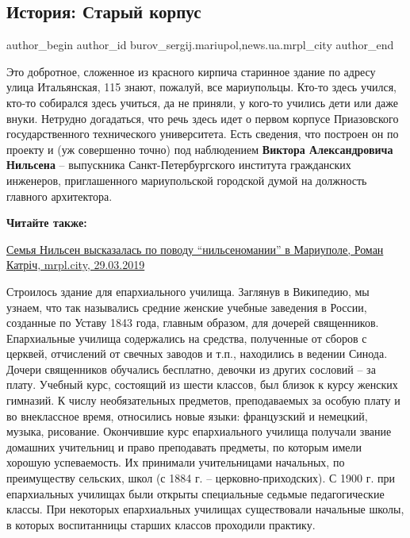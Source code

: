 
 
 
 
 
 
\subsection{История: Старый корпус}
\label{sec:30_03_2019.stz.news.ua.mrpl_city.1.istoria_staryj_korpus}
 
\ifcmt
 author_begin
   author_id burov_sergij.mariupol,news.ua.mrpl_city
 author_end
\fi


Это добротное, сложенное из красного кирпича старинное здание по адресу улица
Итальянская, 115 знают, пожалуй, все мариупольцы. Кто-то здесь учился, кто-то
собирался здесь учиться, да не приняли, у кого-то учились дети или даже внуки.
Нетрудно догадаться, что речь здесь идет о первом корпусе Приазовского
государственного технического университета. Есть сведения, что построен он по
проекту и (уж совершенно точно) под наблюдением \textbf{Виктора Александровича Нильсена}
– выпускника Санкт-Петербургского института гражданских инженеров,
приглашенного мариупольской городской думой на должность главного архитектора.

\textbf{Читайте также:} 

\href{https://mrpl.city/news/view/semya-nilsen-vyskazalas-po-povodu-nilsenomanii-v-mariupole}{%
Семья Нильсен высказалась по поводу \enquote{нильсеномании} в Мариуполе, Роман Катріч, mrpl.city, 29.03.2019}

Строилось здание для епархиального училища. Заглянув в Википедию, мы узнаем,
что так назывались средние женские учебные заведения в России, созданные по
Уставу 1843 года, главным образом, для дочерей священников. Епархиальные
училища содержались на средства, полученные от сборов с церквей, отчислений от
свечных заводов и т.п., находились в ведении Синода. Дочери священников
обучались бесплатно, девочки из других сословий – за плату. Учебный курс,
состоящий из шести классов, был близок к курсу женских гимназий. К числу
необязательных предметов, преподаваемых за особую плату и во внеклассное время,
относились новые языки: французский и немецкий, музыка, рисование. Окончившие
курс епархиального училища получали звание домашних учительниц и право
преподавать предметы, по которым имели хорошую успеваемость. Их принимали
учительницами начальных, по преимуществу сельских, школ (с 1884 г. –
церковно-приходских). С 1900 г. при епархиальных училищах были открыты
специальные седьмые педагогические классы. При некоторых епархиальных училищах
существовали начальные школы, в которых воспитанницы старших классов проходили
практику.

